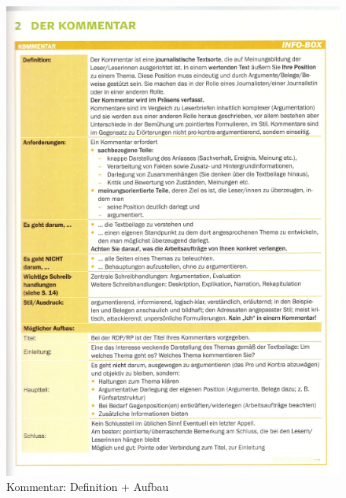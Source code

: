\begin{figure}[h]
    \centering
    \includegraphics[scale=0.8]{./pics/Screenshot from 2023-02-06 12-27-40.png}
    \caption{Kommentar: Definition + Aufbau}
    \label{fig:impl:Kommentar1}
\end{figure}

